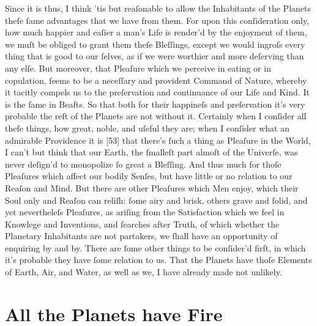 \documentclass[letterpaper]{book}
\begin{document}
Since it is thus, I think 'tis but reaſonable to allow the Inhabitants of
the Planets theſe ſame advantages that we have from them. For upon this conſideration only, how much happier and eaſier a man's Life is render'd by the
enjoyment of them, we muſt be obliged to grant them theſe Bleſſings, except
we would ingroſs every thing that is good to our ſelves, as if we were
worthier and more deſerving than any elſe. But moreover, that Pleaſure which
we perceive in eating or in copulation, ſeems to be a neceſſary and
provident Command of Nature, whereby it tacitly compels us to the preſervation and continuance of our Life and Kind. It is the ſame in Beaſts. So
that both for their happineſs and preſervation it's very probable the reſt
of the Planets are not without it. Certainly when I conſider all theſe
things, how great, noble, and uſeful they are; when I conſider what an
admirable Providence it is [53] that there's ſuch a thing as Pleaſure in the
World, I can't but think that our Earth, the ſmalleſt part almoſt of the
Univerſe, was never deſign'd to monopolize ſo great a Bleſſing. And thus
much for thoſe Pleaſures which affect our bodily Senſes, but have little or
no relation to our Reaſon and Mind. But there are other Pleaſures which Men
enjoy, which their Soul only and Reaſon can reliſh: ſome airy and brisk,
others grave and ſolid, and yet nevertheleſs Pleaſures, as ariſing from the
Satisfaction which we feel in Knowlege and Inventions, and ſearches after
Truth, of which whether the Planetary Inhabitants are not partakers, we
ſhall have an opportunity of enquiring by and by.  There are ſome other
things to be conſider'd firſt, in which it's probable they have ſome
relation to us. That the Planets have thoſe Elements of Earth, Air, and
Water, as well as we, I have already made not unlikely.


\section{All the Planets have Fire}
\end{document}
